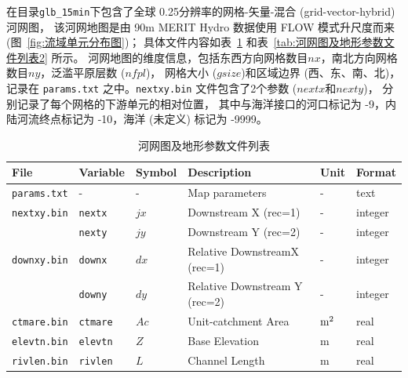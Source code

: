 在目录\texttt{glb\_15min}下包含了全球 0.25\textdegree 分辨率的网格-矢量-混合 (grid-vector-hybrid) 河网图，
该河网地图是由 90m MERIT Hydro 数据使用 FLOW 模式升尺度而来 (图~\ref{fig:流域单元分布图})；
具体文件内容如表~\ref{tab:河网图及地形参数文件列表} 和表~\ref{tab:河网图及地形参数文件列表2} 所示。
河网地图的维度信息，包括东西方向网格数目$nx$，南北方向网格数目$ny$，泛滥平原层数 ($nfpl$)，
网格大小 ($gsize$)和区域边界 (西、东、南、北)，记录在 \texttt{params.txt} 之中。\texttt{nextxy.bin} 文件包含了2个参数 ($nextx$和$nexty$)，
分别记录了每个网格的下游单元的相对位置，
其中与海洋接口的河口标记为 -9，内陆河流终点标记为 -10，海洋 (未定义) 标记为 -9999。

\begin{table}[]
\centering
\caption{河网图及地形参数文件列表}
\label{tab:河网图及地形参数文件列表}
    \begin{tabular}[h]{p{3.5cm}p{1.5cm}p{1.5cm}p{5cm}p{1cm}p{1cm}}  %
    \toprule
    File              & Variable & Symbol                        & Description                                  & Unit    & Format  \\ \midrule
    \texttt{params.txt}        & -        & -                             & Map parameters                     & -         & text    \\
    \texttt{nextxy.bin}        & \texttt{nextx}    & $jx$                         & Downstream X (rec=1)         & -         & integer \\
                                       & \texttt{nexty}    & $jy$                         & Downstream Y (rec=2)            & -        & integer \\
    \texttt{downxy.bin}      & \texttt{downx}   & $dx$                        & Relative DownstreamX (rec=1)   & -   & integer \\
                                       & \texttt{downy}   & $dy$                      & Relative Downstream Y (rec=2)   & -    & integer \\
    \texttt{ctmare.bin}       & \texttt{ctmare}   & $Ac$                     & Unit-catchment Area                     & $\rm m^2$   & real    \\
    \texttt{elevtn.bin}        & \texttt{elevtn}    & $Z$                        & Base Elevation                         & m       & real    \\
    \texttt{rivlen.bin}         & \texttt{rivlen}    & $L$                         & Channel Length                        & m       & real    \\

\end{tabular}
\end{table}

